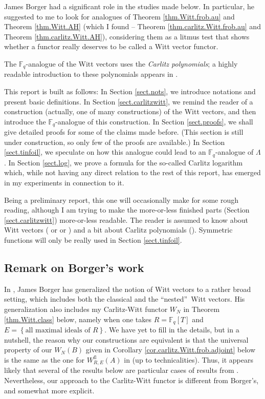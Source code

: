 \documentclass[numbers=enddot,12pt,final,onecolumn,notitlepage]{scrartcl}%
\theoremstyle{definition}
\begin{document}
James Borger had a significant role in the studies made below. In particular,
he suggested to me to look for analogues of Theorem \ref{thm.Witt.frob.au} and
Theorem \ref{thm.Witt.AH} (which I found -- Theorem
\ref{thm.carlitz.Witt.frob.au} and Theorem \ref{thm.carlitz.Witt.AH}),
considering them as a litmus test that shows whether a functor really deserves
to be called a Witt vector functor.

The $\mathbb{F}_{q}$-analogue of the Witt vectors uses the \textit{Carlitz
polynomials}; a highly readable introduction to these polynomials appears in
\cite{kc-carlitz}.

This report is built as follows: In Section \ref{sect.nots}, we introduce
notations and present basic definitions. In Section \ref{sect.carlitzwitt}, we
remind the reader of a construction (actually, one of many constructions) of
the Witt vectors, and then introduce the $\mathbb{F}_{q}$-analogue of this
construction. In Section \ref{sect.proofs}, we shall give detailed proofs for
some of the claims made before. (This section is still under construction, so
only few of the proofs are available.) In Section \ref{sect.tinfoil}, we
speculate on how this analogue could lead to an $\mathbb{F}_{q}$-analogue of
$\Lambda$. In Section \ref{sect.log}, we prove a formula for the so-called
Carlitz logarithm which, while not having any direct relation to the rest of
this report, has emerged in my experiments in connection to it.

Being a preliminary report, this one will occasionally make for some rough
reading, although I am trying to make the more-or-less finished parts (Section
\ref{sect.carlitzwitt}) more-or-less readable. The reader is assumed to know
about Witt vectors (\cite{rabinoff-witt} or \cite{hw-witt1} or \cite[\S 1]%
{hesselholt-drw}) and a bit about Carlitz polynomials (\cite{kc-carlitz}).
Symmetric functions will only be really used in Section \ref{sect.tinfoil}.

\subsection{Remark on Borger's work}

In \cite[\S 1--\S 2]{jb-bg1}, James Borger has generalized the notion of Witt
vectors to a rather broad setting, which includes both the classical and the
\textquotedblleft nested\textquotedblright\ Witt vectors. His generalization
also includes my Carlitz-Witt functor $W_{N}$ in Theorem \ref{thm.Witt.class}
below, namely when one takes $R=\mathbb{F}_{q}\left[  T\right]  $ and
$E=\left\{  \text{all maximal ideals of }R\right\}  $. We have yet to fill in
the details, but in a nutshell, the reason why our constructions are
equivalent is that the universal property of our $W_{N}\left(  B\right)  $
given in Corollary \ref{cor.carlitz.Witt.frob.adjoint} below is the same as
the one for $W_{R,E}^{\operatorname*{fl}}\left(  A\right)  $ in
\cite[Proposition 1.9 (c)]{jb-bg1} (up to technicalities). Thus, it appears
likely that several of the results below are particular cases of results from
\cite{jb-bg1}. Nevertheless, our approach to the Carlitz-Witt functor is
different from Borger's, and somewhat more explicit.
\end{document}
